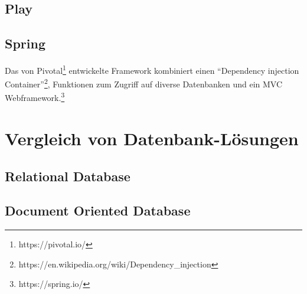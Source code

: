 \subsection{Play}
\subsection{Spring}
Das von Pivotal\footnote{https://pivotal.io/} entwickelte Framework kombiniert einen ``Dependency injection
Container''\footnote{https://en.wikipedia.org/wiki/Dependency\_injection}, Funktionen zum Zugriff auf diverse Datenbanken und ein \ac{MVC}
Webframework.\footnote{https://spring.io/}
\section{Vergleich von Datenbank-Lösungen}
\subsection{Relational Database}
\subsection{Document Oriented Database}